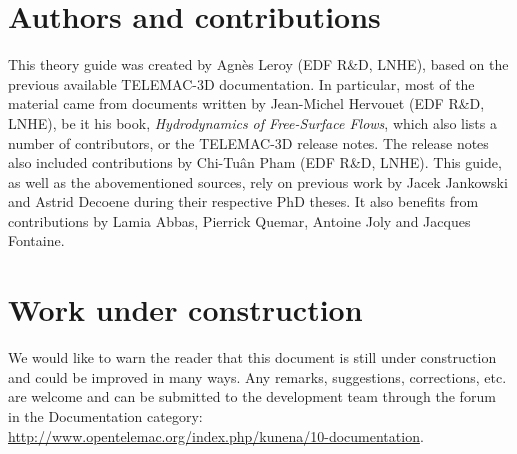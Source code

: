 \documentclass[Telemac3D]{../../data/TelemacDoc} %
\begin{document}
\let\cleardoublepage\clearpage
\title{}
\subtitle{Theory guide}
\version{\telmaversion}
\date{\today}
\maketitle
\clearpage


\newpage

\thispagestyle{empty}

\chapter*{Authors and contributions}
This theory guide was created by Agnès Leroy (EDF R\&D, LNHE), based on the previous available TELEMAC-3D
documentation. In particular, most of the material came from documents written by Jean-Michel
Hervouet (EDF R\&D, LNHE), be it his book, \textit{Hydrodynamics of Free-Surface Flows}, which also lists a number of contributors, or the
TELEMAC-3D release notes. The release notes also included contributions by Chi-Tuân Pham (EDF R\&D, LNHE).
This guide, as well as the abovementioned sources, rely on previous work by Jacek Jankowski and Astrid Decoene during their respective PhD theses.
It also benefits from contributions by Lamia Abbas, Pierrick Quemar, Antoine Joly and Jacques Fontaine.

\newpage

\chapter*{Work under construction}\label{workunderconstruction}
We would like to warn the reader that this document is still under construction
and could be improved in many ways. Any remarks, suggestions, corrections, etc.
are welcome and can be submitted to the \telemacsystem development team through
the forum in the Documentation category:
\url{http://www.opentelemac.org/index.php/kunena/10-documentation}.

\newpage
\end{document}
